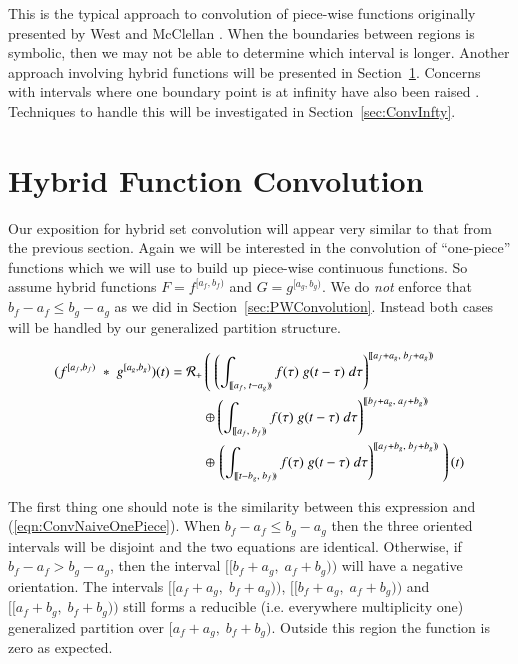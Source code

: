 
This is the typical approach to convolution of piece-wise functions originally presented by West and McClellan 
\cite{west1993symbolic}.
When the boundaries between regions is symbolic, then we may not be able to determine which interval is longer.
Another approach involving hybrid functions will be presented in Section~\ref{sec:HFConvolution}. 
Concerns with intervals where one boundary point is at infinity have also been raised \cite{evans1994algorithms}.
Techniques to handle this will be investigated in Section~\ref{sec:ConvInfty}.








%
%
\section{Hybrid Function Convolution}
\label{sec:HFConvolution}


Our exposition for hybrid set convolution will appear very similar to that from the previous section.
Again we will be interested in the convolution of ``one-piece'' functions which we will use to build up piece-wise
continuous functions.
So assume hybrid functions $F=f^{[a_f, b_f)}$ and $G=g^{[a_g,b_g)}$.
We do \emph{not} enforce that $b_f - a_f \leq b_g - a_g$ as we did in Section~\ref{sec:PWConvolution}.
Instead both cases will be handled by our generalized partition structure.


\begin{align}
	\label{eqn:defHConvolution}
	(f^{[a_f,b_f)} \;*\; g^{[a_g,b_g)}) (t) = 
		\R[+] &\left( \; \left( 
			\int_{[\![a_f,\;t-a_g)\!)} f(\tau) \; g(t-\tau) \; d\tau \right)^{[\![a_f+a_g,\; b_f+a_g)\!)} 
				\right. \notag \\ &\oplus \left( 
			\int_{[\![a_f,\;b_f)\!)} f(\tau) \; g(t-\tau) \; d\tau \right)^{[\![b_f+a_g,\; a_f+b_g)\!)} 
				\notag \\ &\oplus \left. \left( 
			\int_{[\![t-b_g,\;b_f)\!)} f(\tau) \; g(t-\tau) \; d\tau \right)^{[\![a_f+b_g,\; b_f+b_g)\!)} 
				\; \right)(t)
\end{align}

The first thing one should note is the similarity between this expression and (\ref{eqn:ConvNaiveOnePiece}).
When $b_f - a_f \leq b_g - a_g$ then the three oriented intervals will be disjoint and the two equations are identical.
Otherwise, if $b_f - a_f > b_g - a_g$, then the interval $[\![b_f +a_g, \; a_f + b_g)\!)$ will have a negative orientation.
The intervals $[\![a_f+a_g, \; b_f+a_g)\!)$, $[\![b_f+a_g, \; a_f+b_g)\!)$ and $[\![a_f+b_g, \; b_f+b_g)\!)$ still forms
a reducible (i.e. everywhere multiplicity one) generalized partition over $[a_f+a_g, \; b_f+b_g)$.
Outside this region the function is zero as expected. 



